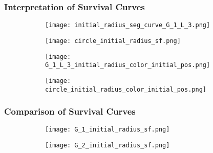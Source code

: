         

        



    \subsubsection{Interpretation of Survival Curves}

     \begin{figure}
        \centering
        \begin{subfigure}[b]{0.45\textwidth}
          \texttt{[image: initial\_radius\_seg\_curve\_G\_1\_L\_3.png]}
          \caption{}
          \label{fig:G_1_L_3_radius_sf}
        \end{subfigure}
        \hfill
        \begin{subfigure}[b]{0.45\textwidth}
          \texttt{[image: circle\_initial\_radius\_sf.png]}
          \caption{}
          \label{fig:circle_radius_sf}
        \end{subfigure}
        \caption{}
        \label{fig:shape_sf_radius}
     \end{figure}


     \begin{figure}
        \centering
        \begin{subfigure}[b]{0.45\textwidth}
          \texttt{[image: G\_1\_L\_3\_initial\_radius\_color\_initial\_pos.png]}
          \caption{}
          \label{fig:G_1_L_3_radius_initial_pos}
        \end{subfigure}
        \hfill
        \begin{subfigure}[b]{0.45\textwidth}
          \texttt{[image: circle\_initial\_radius\_color\_initial\_pos.png]}
          \caption{}
          \label{fig:circle_radius_initial_pos}
        \end{subfigure}
        \caption{}
        \label{fig:radius_initial_pos}
     \end{figure}

     
     
   
   \subsubsection{Comparison of Survival Curves}


      \begin{figure}
        \centering      
        \begin{subfigure}[b]{0.45\textwidth}
          \texttt{[image: G\_1\_initial\_radius\_sf.png]}
          \caption{}
          \label{fig:sf_g1_branch_radius}
        \end{subfigure}
        \hfill
        \begin{subfigure}[b]{0.45\textwidth}
          \texttt{[image: G\_2\_initial\_radius\_sf.png]}
          \caption{}
          \label{fig:sf_g2_branch_radius}
        \end{subfigure}
        \caption{}
        \label{fig:sf_branch_radius}

      \end{figure}




